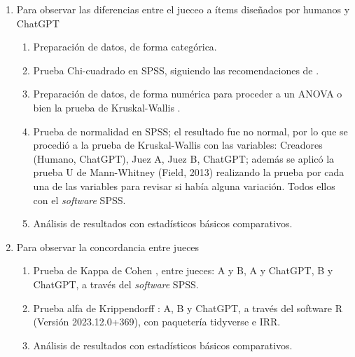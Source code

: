 \begin{enumerate}[label=\Alph*)]
\item Para observar las diferencias entre el jueceo a ítems diseñados por humanos y ChatGPT
\begin{enumerate}[label=\arabic*.]
\item Preparación de datos, de forma categórica.
\item Prueba Chi-cuadrado en SPSS, siguiendo las recomendaciones de \cite{Field2013}.
\item Preparación de datos, de forma numérica para proceder a un ANOVA o
bien la prueba de Kruskal-Wallis \cite{Field2013,Howell2012}.
\item Prueba de normalidad en SPSS; el resultado fue no normal, por lo que
se procedió a la prueba de Kruskal-Wallis con las variables: Creadores
(Humano, ChatGPT), Juez A, Juez B, ChatGPT; además se aplicó la prueba
U de Mann-Whitney (Field, 2013) realizando la prueba por cada una de
las variables para revisar si había alguna variación. Todos ellos con
el \emph{software} SPSS.
\item Análisis de resultados con estadísticos básicos comparativos.
\end{enumerate}

\item Para observar la concordancia entre jueces
\begin{enumerate}[label=\arabic*.]
\item Prueba de Kappa de Cohen \cite{McHugh2012}, entre jueces: A y B, A y
ChatGPT, B y ChatGPT, a través del \emph{software} SPSS.
\item Prueba alfa de Krippendorff \cite{Hayes2007}: A, B y ChatGPT, a través del software R (Versión 2023.12.0+369), con	paquetería tidyverse e IRR.
\item Análisis de resultados con estadísticos básicos comparativos.
\end{enumerate}

\end{enumerate}
